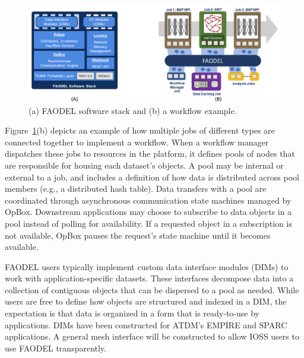 \begin{figure}[htb]
	\centering
	\includegraphics[width=6in]{projects/2.3.6-NNSA/2.3.6.03-SNL-ATDM/faodel-diagram}
	\caption{\label{fig:faodel-diagram}(a) FAODEL software stack and (b) a workflow example.}
\end{figure}


Figure~\ref{fig:faodel-diagram}(b) depicts an example of how multiple jobs of different types are connected together to implement a workflow. When a workflow manager dispatches these jobs to resources in the platform, it defines pools of nodes that are responsible for housing each dataset's objects. A pool may be internal or external to a job, and includes a definition of how data is distributed across pool members (e.g., a distributed hash table). Data transfers with a pool are coordinated through asynchronous communication state machines managed by OpBox. Downstream applications may choose to subscribe to data objects in a pool instead of polling for availability. If a requested object in a subscription is not available, OpBox pauses the request's state machine until it becomes available.

FAODEL users typically implement custom data interface modules (DIMs) to work with application-specific datasets. These interfaces decompose data into a collection of contiguous objects that can be dispersed to a pool as needed. While users are free to define how objects are structured and indexed in a DIM, the expectation is that data is organized in a form that is ready-to-use by applications. DIMs have been constructed for ATDM's EMPIRE and SPARC applications. A general mesh interface will be constructed to allow IOSS users to use FAODEL transparently.

